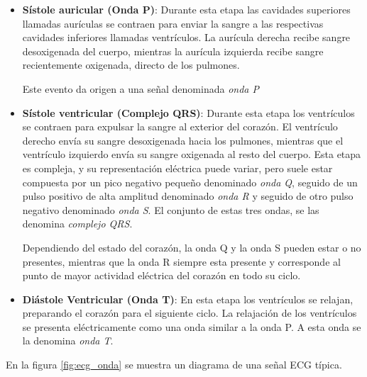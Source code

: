 \documentclass[conference]{IEEEtran}
\begin{document}
\begin{itemize}
    \item \textbf{Sístole auricular (Onda P)}:
        Durante esta etapa las cavidades superiores llamadas aurículas se contraen
        para enviar la sangre a las respectivas cavidades inferiores llamadas
        ventrículos.
        La aurícula derecha recibe sangre desoxigenada del cuerpo, mientras la
        aurícula izquierda recibe sangre recientemente oxigenada, directo de los
        pulmones.

        Este evento da origen a una señal denominada \textit{onda P}

    \item \textbf{Sístole ventricular (Complejo QRS)}:
        Durante esta etapa los ventrículos se contraen para expulsar la sangre
        al exterior del corazón. El ventrículo derecho envía su sangre desoxigenada
        hacia los pulmones, mientras que el ventrículo izquierdo envía su sangre
        oxigenada al resto del cuerpo.
        Esta etapa es compleja, y su representación eléctrica puede variar, pero
        suele estar compuesta por un pico negativo pequeño denominado \textit{onda Q},
        seguido de un pulso positivo de alta amplitud denominado \textit{onda R} y
        seguido de otro pulso negativo denominado \textit{onda S}. El
        conjunto de estas tres ondas, se las denomina \textit{complejo QRS}.
        
        Dependiendo del estado del corazón, la onda Q y la onda S pueden estar o no
        presentes, mientras que la onda R siempre esta presente y corresponde al
        punto de mayor actividad eléctrica del corazón en todo su ciclo.


    \item \textbf{Diástole Ventricular (Onda T)}:
        En esta etapa los ventrículos se relajan, preparando el corazón para el
        siguiente ciclo. La relajación de los ventrículos se presenta eléctricamente
        como una onda similar a la onda P. A esta onda se la denomina \textit{onda T}.

\end{itemize}

En la figura \ref{fig:ecg_onda} se muestra un diagrama de una señal ECG típica.
\end{document}
